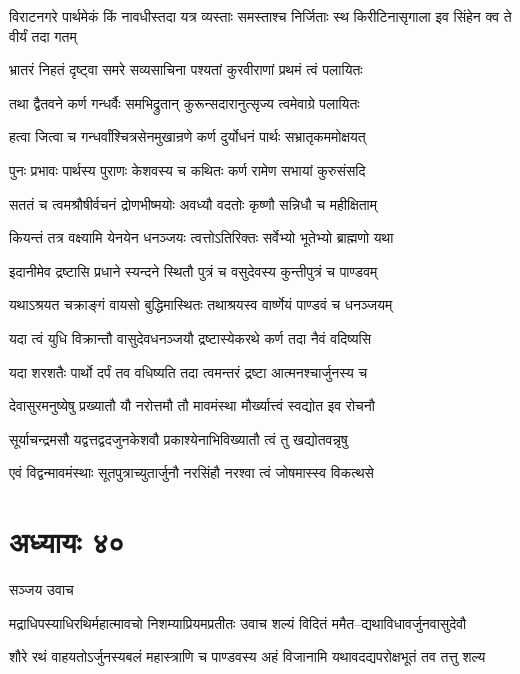 \twolineshloka
{विराटनगरे पार्थमेकं किं नावधीस्तदा}
{यत्र व्यस्ताः समस्ताश्च निर्जिताः स्थ किरीटिनासृगाला इव सिंहेन क्व ते वीर्यं तदा गतम्}


\twolineshloka
{भ्रातरं निहतं दृष्ट्वा समरे सव्यसाचिना}
{पश्यतां कुरवीराणां प्रथमं त्वं पलायितः}


\twolineshloka
{तथा द्वैतवने कर्ण गन्धर्वैः समभिद्रुतान्}
{कुरून्सदारानुत्सृज्य त्वमेवाग्रे पलायितः}


\twolineshloka
{हत्वा जित्वा च गन्धर्वांश्चित्रसेनमुखान्रणे}
{कर्ण दुर्योधनं पार्थः सभ्रातृकममोक्षयत्}


\twolineshloka
{पुनः प्रभावः पार्थस्य पुराणः केशवस्य च}
{कथितः कर्ण रामेण सभायां कुरुसंसदि}


\twolineshloka
{सततं च त्वमश्रौषीर्वचनं द्रोणभीष्मयोः}
{अवध्यौ वदतोः कृष्णौ सन्निधौ च महीक्षिताम्}


\twolineshloka
{कियन्तं तत्र वक्ष्यामि येनयेन धनञ्जयः}
{त्वत्तोऽतिरिक्तः सर्वेभ्यो भूतेभ्यो ब्राह्मणो यथा}


\twolineshloka
{इदानीमेव द्रष्टासि प्रधाने स्यन्दने स्थितौ}
{पुत्रं च वसुदेवस्य कुन्तीपुत्रं च पाण्डवम्}


\twolineshloka
{यथाऽश्रयत चक्राङ्गं वायसो बुद्धिमास्थितः}
{तथाश्रयस्व वार्ष्णेयं पाण्डवं च धनञ्जयम्}


\twolineshloka
{यदा त्वं युधि विक्रान्तौ वासुदेवधनञ्जयौ}
{द्रष्टास्येकरथे कर्ण तदा नैवं वदिष्यसि}


\twolineshloka
{यदा शरशतैः पार्थो दर्पं तव वधिष्यति}
{तदा त्वमन्तरं द्रष्टा आत्मनश्चार्जुनस्य च}


\twolineshloka
{देवासुरमनुष्येषु प्रख्यातौ यौ नरोत्तमौ}
{तौ मावमंस्था मौर्ख्यात्त्वं स्वद्योत इव रोचनौ}


\twolineshloka
{सूर्याचन्द्रमसौ यद्वत्तद्वदजुनकेशवौ}
{प्रकाश्येनाभिविख्यातौ त्वं तु खद्योतवन्नृषु}


\twolineshloka
{एवं विद्वन्मावमंस्थाः सूतपुत्राच्युतार्जुनौ}
{नरसिंहौ नरश्वा त्वं जोषमास्स्व विकत्थसे}


\chapter{अध्यायः ४०}
\twolineshloka
{सञ्जय उवाच}
{}


\twolineshloka
{मद्राधिपस्याधिरथिर्महात्मावचो निशम्याप्रियमप्रतीतः}
{उवाच शल्यं विदितं ममैत--द्यथाविधावर्जुनवासुदेवौ}


\twolineshloka
{शौरे रथं वाहयतोऽर्जुनस्यबलं महास्त्राणि च पाण्डवस्य}
{अहं विजानामि यथावदद्यपरोक्षभूतं तव तत्तु शल्य}


